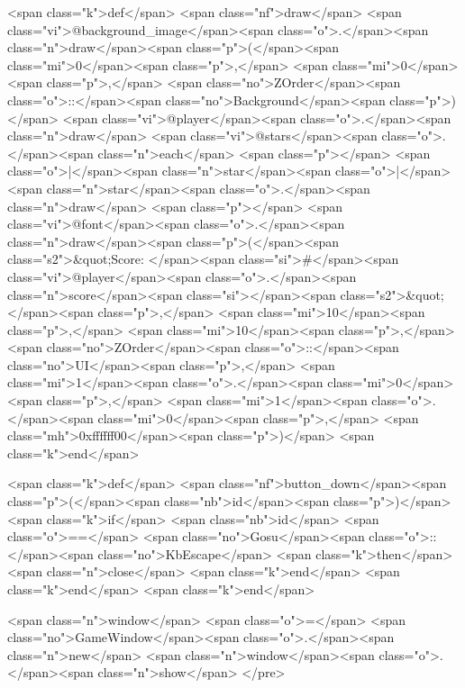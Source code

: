\begin{rawhtml}
  <span class="k">def</span> <span class="nf">draw</span>
    <span class="vi">@background_image</span><span class="o">.</span><span class="n">draw</span><span class="p">(</span><span class="mi">0</span><span class="p">,</span> <span class="mi">0</span><span class="p">,</span> <span class="no">ZOrder</span><span class="o">::</span><span class="no">Background</span><span class="p">)</span>
    <span class="vi">@player</span><span class="o">.</span><span class="n">draw</span>
    <span class="vi">@stars</span><span class="o">.</span><span class="n">each</span> <span class="p">{</span> <span class="o">|</span><span class="n">star</span><span class="o">|</span> <span class="n">star</span><span class="o">.</span><span class="n">draw</span> <span class="p">}</span>
    <span class="vi">@font</span><span class="o">.</span><span class="n">draw</span><span class="p">(</span><span class="s2">&quot;Score: </span><span class="si">#{</span><span class="vi">@player</span><span class="o">.</span><span class="n">score</span><span class="si">}</span><span class="s2">&quot;</span><span class="p">,</span> <span class="mi">10</span><span class="p">,</span> <span class="mi">10</span><span class="p">,</span> <span class="no">ZOrder</span><span class="o">::</span><span class="no">UI</span><span class="p">,</span> <span class="mi">1</span><span class="o">.</span><span class="mi">0</span><span class="p">,</span> <span class="mi">1</span><span class="o">.</span><span class="mi">0</span><span class="p">,</span> <span class="mh">0xffffff00</span><span class="p">)</span>
  <span class="k">end</span>

  <span class="k">def</span> <span class="nf">button_down</span><span class="p">(</span><span class="nb">id</span><span class="p">)</span>
    <span class="k">if</span> <span class="nb">id</span> <span class="o">==</span> <span class="no">Gosu</span><span class="o">::</span><span class="no">KbEscape</span> <span class="k">then</span>
      <span class="n">close</span>
    <span class="k">end</span>
  <span class="k">end</span>
<span class="k">end</span>

<span class="n">window</span> <span class="o">=</span> <span class="no">GameWindow</span><span class="o">.</span><span class="n">new</span>
<span class="n">window</span><span class="o">.</span><span class="n">show</span>
    </pre>
    \end{rawhtml}
  
